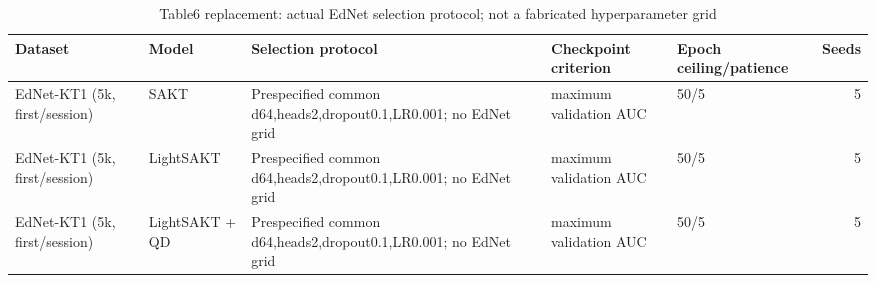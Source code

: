 \begin{table}
\caption{Table6 replacement: actual EdNet selection protocol; not a fabricated hyperparameter grid}
\begin{tabular}{lllllr}
\toprule
Dataset & Model & Selection protocol & Checkpoint criterion & Epoch ceiling/patience & Seeds \\
\midrule
EdNet-KT1 (5k, first/session) & SAKT & Prespecified common d64,heads2,dropout0.1,LR0.001; no EdNet grid & maximum validation AUC & 50/5 & 5 \\
EdNet-KT1 (5k, first/session) & LightSAKT & Prespecified common d64,heads2,dropout0.1,LR0.001; no EdNet grid & maximum validation AUC & 50/5 & 5 \\
EdNet-KT1 (5k, first/session) & LightSAKT + QD & Prespecified common d64,heads2,dropout0.1,LR0.001; no EdNet grid & maximum validation AUC & 50/5 & 5 \\
\bottomrule
\end{tabular}
\end{table}
